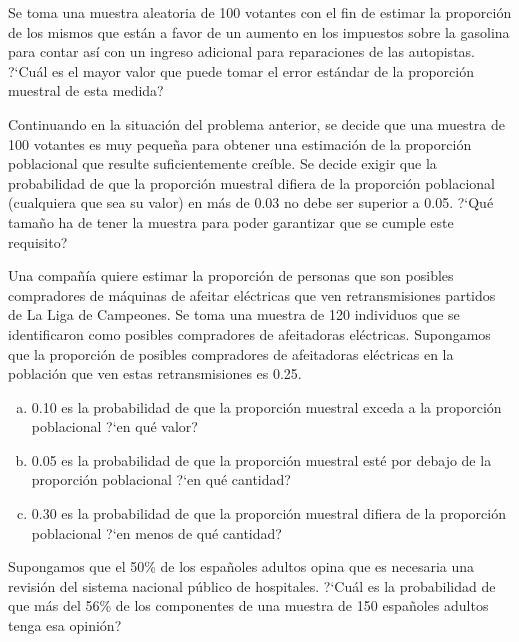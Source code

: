 \documentclass[12pt]{article}
\begin{document}
\begin{prob}
    Se toma una muestra aleatoria de 100 votantes con el fin
    de estimar la proporción de los mismos que están a favor de
    un aumento en los impuestos sobre la gasolina para contar
    así con un ingreso adicional para reparaciones de las
    autopistas.  ?`Cuál es el mayor valor que puede tomar el
    error estándar de la proporción muestral de esta medida?
    \end{prob}

\begin{prob}
    Continuando en la situación del problema anterior, se decide que
    una muestra de 100 votantes es muy pequeña para obtener una
    estimación de la proporción poblacional que resulte
    suficientemente creíble. Se decide exigir que la probabilidad de
    que la proporción muestral difiera de la proporción poblacional
    (cualquiera que sea su valor) en más de 0.03 no debe ser superior
    a 0.05. ?`Qué tamaño ha de tener la muestra para poder garantizar
    que se cumple este requisito?
    \end{prob}

    \begin{prob}
Una compañía quiere estimar la proporción de personas que son posibles compradores de
máquinas de afeitar eléctricas que ven retransmisiones partidos de La Liga de Campeones. Se
toma una muestra de 120 individuos que se identificaron como posibles compradores de
afeitadoras eléctricas. Supongamos que la proporción de posibles compradores de afeitadoras
eléctricas  en la población que ven estas retransmisiones es 0.25.
\begin{enumerate}[a)]
    \item 0.10 es la probabilidad de que la proporción muestral
    exceda a la proporción poblacional ?`en qué valor?
        \item 0.05 es la probabilidad de que la proporción muestral
    esté por debajo de la proporción poblacional ?`en qué cantidad?
        \item 0.30 es la probabilidad de que la proporción muestral
    difiera de la proporción poblacional ?`en menos de qué cantidad?
    \end{enumerate}
    \end{prob}
    \begin{prob}
        Supongamos que el 50\% de los españoles adultos opina que es
        necesaria una revisión del sistema nacional público de hospitales.
        ?`Cuál es la probabilidad de que más del 56\% de los componentes
        de una muestra de 150 españoles adultos tenga esa opinión?
        \end{prob}
\end{document}
